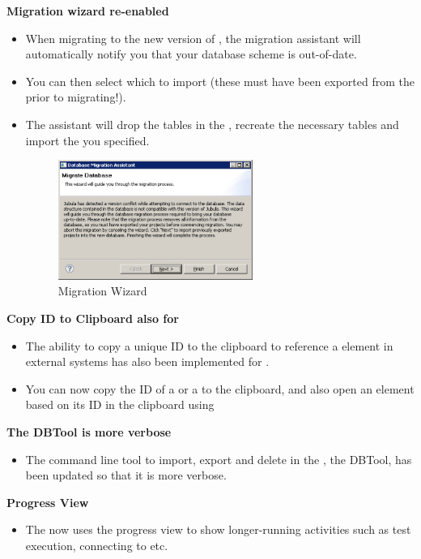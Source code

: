 \textbf{Migration wizard re-enabled}
\begin{itemize}
\item  When migrating to the new version of \app{}, the migration assistant will automatically notify you that your database scheme is out-of-date. 
\item You can then select which \gdprojects{} to import (these must have been exported from the \gddb{} prior to migrating!).
\item The assistant will drop the tables in the \gddb{}, recreate the necessary tables and import the \gdprojects{} you specified.

\begin{figure}[h]
\begin{center}
\includegraphics[width=0.6\textwidth]{52/ps/Migration}
\caption{Migration Wizard}
\label{RNMigration}
\end{center}
\end{figure}

\end{itemize}


\textbf{Copy ID to Clipboard also for \gdsuites{}}
\begin{itemize}
\item The ability to copy a unique ID to the clipboard to reference a \app{} element in external systems has also been implemented for \gdsuites{}. 
\item You can now copy the ID of a \gdcase{} or a \gdsuite{} to the clipboard, and also open an element based on its ID in the clipboard using 
\end{itemize}

\textbf{The DBTool is more verbose}
\begin{itemize}
\item The command line tool to import, export and delete \gdprojects{} in the \gddb{}, the DBTool, has been updated so that it is more verbose.
\end{itemize}

\textbf{Progress View}
\begin{itemize}
\item The \ite{} now  uses the progress view to show longer-running activities such as test execution, connecting to \gdauts{} etc.
\end{itemize}

